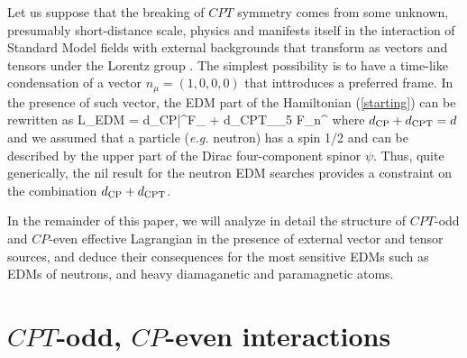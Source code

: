 \documentclass[prl,twocolumn,tightenlines,preprintnumbers,floatfix,nofootinbib]{revtex4}
\begin{document}
Let us suppose that the breaking of $CPT$ symmetry comes from 
some unknown, presumably short-distance scale, physics and 
manifests itself in the interaction of Standard Model fields with
external backgrounds that transform as vectors and tensors 
under the Lorentz group \cite{Kost,CG}. The simplest possibility
is to have a time-like condensation of a vector $n_\mu = (1,0,0,0)$
that inttroduces a preferred frame. In the presence of such vector, 
the EDM part of the Hamiltonian (\ref{starting}) can be rewritten 
as 
\be
{\cal L}_{\rm EDM} = d_{\rm CP}\bar \psi \sigma^{\mu\nu}F_{\mu\nu} \psi 
+ d_{\rm CPT}\psi \gamma_\mu\gamma_5 \psi F_{\mu\nu}n^{\nu}
\label{start}
\ee
where $d_{\rm CP}+d_{\rm CPT}=d$ and 
we assumed that a particle ({\it e.g.} neutron) has a spin 1/2 and can be described by the 
upper part of the Dirac four-component spinor $\psi$. Thus, quite generically, 
the nil result for the neutron EDM searches provides a constraint on the combination 
$d_{\rm CP}+d_{\rm CPT}$.

In the remainder of this paper, we will analyze in detail the structure of 
$CPT$-odd and $CP$-even effective Lagrangian in the presence of 
external vector and tensor sources, and deduce their consequences for the most sensitive 
EDMs such as EDMs of neutrons, and heavy diamaganetic and paramagnetic atoms. 

\section{$CPT$-odd, $CP$-even interactions}
\end{document}
